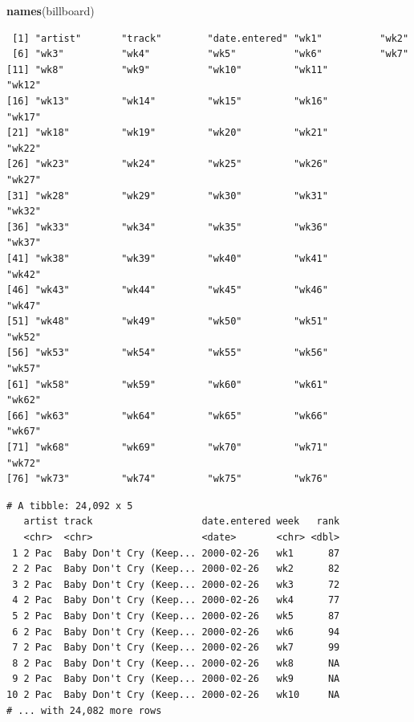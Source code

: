 \documentclass[
  11pt,
]{krantz}
\newenvironment{Shaded}{\begin{snugshade}}{\end{snugshade}}
\newcommand{\CommentTok}[1]{\textcolor[rgb]{0.37,0.37,0.37}{\textit{#1}}}
\newcommand{\DataTypeTok}[1]{\textcolor[rgb]{0.27,0.27,0.27}{#1}}
\newcommand{\KeywordTok}[1]{\textcolor[rgb]{0.27,0.27,0.27}{\textbf{#1}}}
\newcommand{\NormalTok}[1]{#1}
\newcommand{\OperatorTok}[1]{\textcolor[rgb]{0.43,0.43,0.43}{\textbf{#1}}}
\newcommand{\StringTok}[1]{\textcolor[rgb]{0.5,0.5,0.5}{#1}}
\begin{document}
\begin{Shaded}
\begin{Highlighting}[]
\KeywordTok{names}\NormalTok{(billboard)}
\end{Highlighting}
\end{Shaded}

\begin{verbatim}
 [1] "artist"       "track"        "date.entered" "wk1"          "wk2"         
 [6] "wk3"          "wk4"          "wk5"          "wk6"          "wk7"         
[11] "wk8"          "wk9"          "wk10"         "wk11"         "wk12"        
[16] "wk13"         "wk14"         "wk15"         "wk16"         "wk17"        
[21] "wk18"         "wk19"         "wk20"         "wk21"         "wk22"        
[26] "wk23"         "wk24"         "wk25"         "wk26"         "wk27"        
[31] "wk28"         "wk29"         "wk30"         "wk31"         "wk32"        
[36] "wk33"         "wk34"         "wk35"         "wk36"         "wk37"        
[41] "wk38"         "wk39"         "wk40"         "wk41"         "wk42"        
[46] "wk43"         "wk44"         "wk45"         "wk46"         "wk47"        
[51] "wk48"         "wk49"         "wk50"         "wk51"         "wk52"        
[56] "wk53"         "wk54"         "wk55"         "wk56"         "wk57"        
[61] "wk58"         "wk59"         "wk60"         "wk61"         "wk62"        
[66] "wk63"         "wk64"         "wk65"         "wk66"         "wk67"        
[71] "wk68"         "wk69"         "wk70"         "wk71"         "wk72"        
[76] "wk73"         "wk74"         "wk75"         "wk76"        
\end{verbatim}

\begin{Shaded}
\end{Shaded}

\begin{verbatim}
# A tibble: 24,092 x 5
   artist track                   date.entered week   rank
   <chr>  <chr>                   <date>       <chr> <dbl>
 1 2 Pac  Baby Don't Cry (Keep... 2000-02-26   wk1      87
 2 2 Pac  Baby Don't Cry (Keep... 2000-02-26   wk2      82
 3 2 Pac  Baby Don't Cry (Keep... 2000-02-26   wk3      72
 4 2 Pac  Baby Don't Cry (Keep... 2000-02-26   wk4      77
 5 2 Pac  Baby Don't Cry (Keep... 2000-02-26   wk5      87
 6 2 Pac  Baby Don't Cry (Keep... 2000-02-26   wk6      94
 7 2 Pac  Baby Don't Cry (Keep... 2000-02-26   wk7      99
 8 2 Pac  Baby Don't Cry (Keep... 2000-02-26   wk8      NA
 9 2 Pac  Baby Don't Cry (Keep... 2000-02-26   wk9      NA
10 2 Pac  Baby Don't Cry (Keep... 2000-02-26   wk10     NA
# ... with 24,082 more rows
\end{verbatim}
\end{document}
